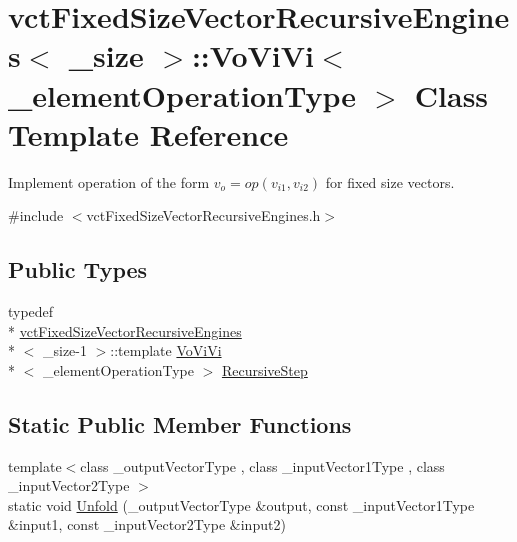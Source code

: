 \hypertarget{classvct_fixed_size_vector_recursive_engines_1_1_vo_vi_vi}{\section{vct\-Fixed\-Size\-Vector\-Recursive\-Engines$<$ \-\_\-size $>$\-:\-:Vo\-Vi\-Vi$<$ \-\_\-element\-Operation\-Type $>$ Class Template Reference}
\label{classvct_fixed_size_vector_recursive_engines_1_1_vo_vi_vi}
}


Implement operation of the form $v_o = op(v_{i1}, v_{i2})$ for fixed size vectors.  




{\ttfamily \#include $<$vct\-Fixed\-Size\-Vector\-Recursive\-Engines.\-h$>$}

\subsection*{Public Types}
\begin{DoxyCompactItemize}
\item 
typedef \\*
\hyperlink{classvct_fixed_size_vector_recursive_engines}{vct\-Fixed\-Size\-Vector\-Recursive\-Engines}\\*
$<$ \-\_\-size-\/1 $>$\-::template \hyperlink{classvct_fixed_size_vector_recursive_engines_1_1_vo_vi_vi}{Vo\-Vi\-Vi}\\*
$<$ \-\_\-element\-Operation\-Type $>$ \hyperlink{classvct_fixed_size_vector_recursive_engines_1_1_vo_vi_vi_ab2721312ef2322e61092499ea592bef5}{Recursive\-Step}
\end{DoxyCompactItemize}
\subsection*{Static Public Member Functions}
\begin{DoxyCompactItemize}
\item 
{\footnotesize template$<$class \-\_\-output\-Vector\-Type , class \-\_\-input\-Vector1\-Type , class \-\_\-input\-Vector2\-Type $>$ }\\static void \hyperlink{classvct_fixed_size_vector_recursive_engines_1_1_vo_vi_vi_a0085c6d9a5fba75ef6922a41f5fc8e81}{Unfold} (\-\_\-output\-Vector\-Type \&output, const \-\_\-input\-Vector1\-Type \&input1, const \-\_\-input\-Vector2\-Type \&input2)
\end{DoxyCompactItemize}


